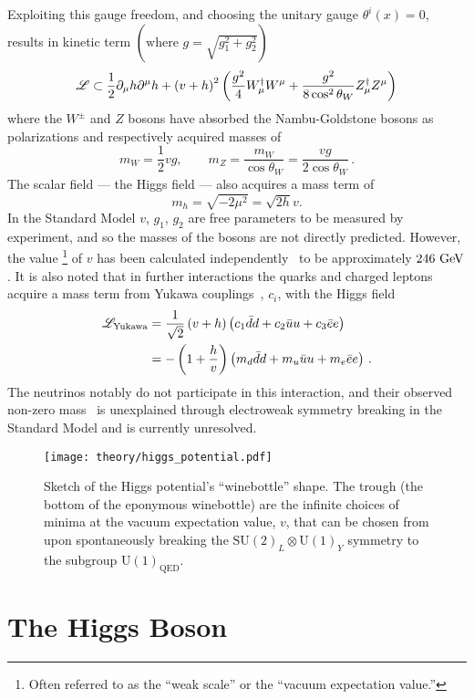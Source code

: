 Exploiting this gauge freedom, and choosing the unitary gauge $\theta^{i}(x)=0$, results in kinetic term $\left(\textrm{where } g = \sqrt{g_{1}^{2} + g_{2}^{2}}\right)$
\[
 \mathscr{L} \subset \frac{1}{2}\partial_{\mu} h \partial^{\mu} h + \left(v + h\right)^{2} \left(\frac{g^{2}}{4} W_{\mu}^{\dagger}W^{\mu} + \frac{g^{2}}{8 \cos^2 \theta_{W}} Z_{\mu}^{\dagger}Z^{\mu}\right)
\]
where the $W^{\pm}$ and $Z$ bosons have absorbed the Nambu-Goldstone bosons as polarizations and respectively acquired masses of
\[
 m_{W} = \frac{1}{2}vg, \qquad m_{Z} = \frac{m_{W}}{\cos\theta_{W}} = \frac{vg}{2\cos\theta_{W}}\,.
\]
The scalar field --- the Higgs field --- also acquires a mass term of
\[
 m_{h} = \sqrt{-2\mu^{2}} = \sqrt{2h}v.
\]
In the Standard Model $v$, $g_{1}$, $g_{2}$ are free parameters to be measured by experiment, and so the masses of the bosons are not directly predicted.
However, the value%
\footnote{Often referred to as the ``weak scale'' or the ``vacuum expectation value.''}
of $v$ has been calculated independently~\cite{Plehn:2005nk} to be approximately $246~\mathrm{GeV}$.
It is also noted that in further interactions the quarks and charged leptons acquire a mass term from Yukawa couplings~\cite{Yukawa:1935xg}, $c_i$, with the Higgs field
\[
 \begin{split}
  \mathscr{L}_{\textrm{Yukawa}} &= \frac{1}{\sqrt{2}} \left(v+h\right) \left(c_{1}\bar{d}d + c_{2}\bar{u}u + c_{3}\bar{e}e\right) \\
  &= - \left(1 + \frac{h}{v}\right)\left(m_{d}\bar{d}d + m_{u}\bar{u}u + m_{e}\bar{e}e\right)\,.
 \end{split}
\]
The neutrinos notably do not participate in this interaction, and their observed non-zero mass~\cite{Ahmad:2001an} is unexplained through electroweak symmetry breaking in the Standard Model and is currently unresolved.

\begin{figure}[htbp]
 \centering
 \texttt{[image: theory/higgs\_potential.pdf]}
 \caption[Sketch of the Higgs potential shape.]{%
 Sketch of the Higgs potential's ``winebottle'' shape.
 The trough (the bottom of the eponymous winebottle) are the infinite choices of minima at the vacuum expectation value, $v$, that can be chosen from upon spontaneously breaking the $\mathrm{SU}(2)_{L} \otimes \mathrm{U}(1)_{Y}$ symmetry to the subgroup $\mathrm{U}(1)_{\textrm{QED}}$.}
 \label{fig:Higgs_potential}
\end{figure}

\section{The Higgs Boson}\label{section:Higgs_boson}

